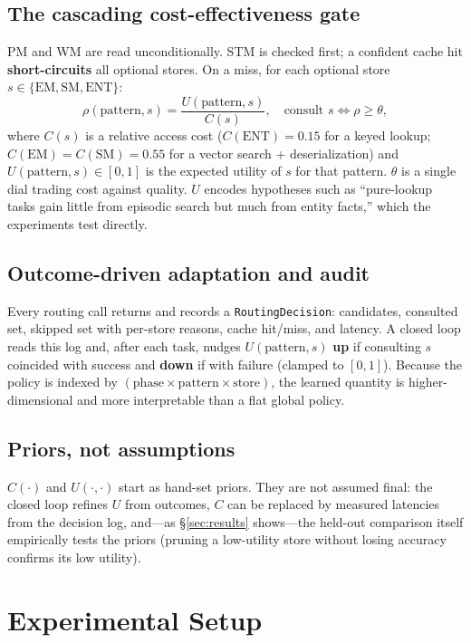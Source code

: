 \documentclass[10pt,twocolumn]{article}
\begin{document}
\subsection{The cascading cost-effectiveness gate}\label{sec:gate}
PM and WM are read unconditionally. STM is checked first; a confident cache hit
\textbf{short-circuits} all optional stores. On a miss, for each optional store
$s \in \{\text{EM},\text{SM},\text{ENT}\}$:
\[
\rho(\text{pattern},s) = \frac{U(\text{pattern},s)}{C(s)},\quad
\text{consult } s \iff \rho \geq \theta,
\]
where $C(s)$ is a relative access cost ($C(\text{ENT}){=}0.15$ for a keyed
lookup; $C(\text{EM}){=}C(\text{SM}){=}0.55$ for a vector search +
deserialization) and $U(\text{pattern},s)\in[0,1]$ is the expected utility of $s$
for that pattern. $\theta$ is a single dial trading cost against quality. $U$
encodes hypotheses such as ``pure-lookup tasks gain little from episodic search
but much from entity facts,'' which the experiments test directly.

\subsection{Outcome-driven adaptation and audit}\label{sec:loop}
Every routing call returns and records a \texttt{RoutingDecision}: candidates,
consulted set, skipped set with per-store reasons, cache hit/miss, and latency. A
closed loop reads this log and, after each task, nudges $U(\text{pattern},s)$
\textbf{up} if consulting $s$ coincided with success and \textbf{down} if with
failure (clamped to $[0,1]$). Because the policy is indexed by
$(\text{phase}\times\text{pattern}\times\text{store})$, the learned quantity is
higher-dimensional and more interpretable than a flat global policy.

\subsection{Priors, not assumptions}
$C(\cdot)$ and $U(\cdot,\cdot)$ start as hand-set priors. They are not assumed
final: the closed loop refines $U$ from outcomes, $C$ can be replaced by measured
latencies from the decision log, and---as \S\ref{sec:results} shows---the
held-out comparison itself empirically tests the priors (pruning a low-utility
store without losing accuracy confirms its low utility).

\section{Experimental Setup}
\end{document}
